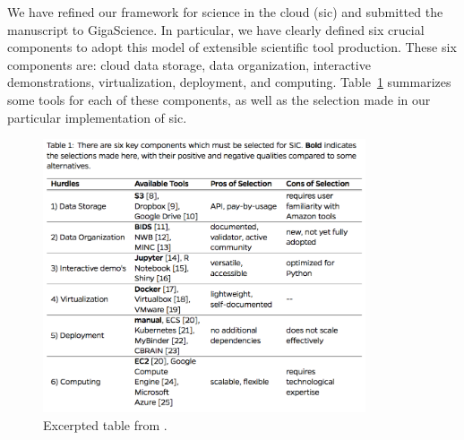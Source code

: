 \documentclass[simplex.tex]{subfiles}
\begin{document}
We have refined our framework for science in the cloud (sic) and
submitted the manuscript to GigaScience. In particular, we have clearly
defined six crucial components to adopt this model of extensible
scientific tool production. These six components are: cloud data
storage, data organization, interactive demonstrations, virtualization,
deployment, and computing. Table~\ref{fig:sicTab} summarizes some tools for
each of these components, as well as the selection made in our
particular implementation of sic.


\begin{figure}[h!]
\begin{cframed}
\centering
\includegraphics[width=0.85\textwidth]{./figs/sicTab.png}
\caption{
  Excerpted table from \cite{kiar2016}.
}
\label{fig:sicTab}
\end{cframed}
\end{figure}
\end{document}
